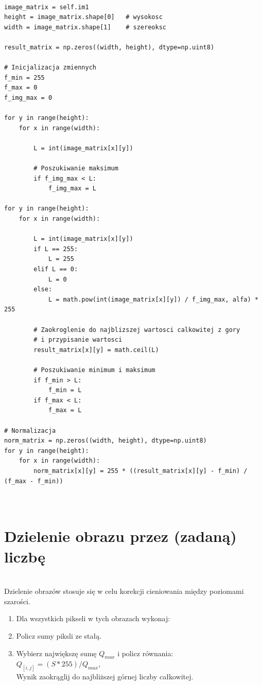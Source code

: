 \documentclass[final,a4paper,openany,12pt]{mwbk}
\begin{document}
\begin{lstlisting}[caption=Potęgowanie obrazu szarego (z zadaną potęgą)]

image_matrix = self.im1
height = image_matrix.shape[0]   # wysokosc
width = image_matrix.shape[1]    # szereoksc

result_matrix = np.zeros((width, height), dtype=np.uint8)

# Inicjalizacja zmiennych
f_min = 255
f_max = 0
f_img_max = 0

for y in range(height):
    for x in range(width):  
        
        L = int(image_matrix[x][y])

        # Poszukiwanie maksimum
        if f_img_max < L:
            f_img_max = L

for y in range(height):
    for x in range(width):  
        
        L = int(image_matrix[x][y])
        if L == 255:
            L = 255
        elif L == 0:
            L = 0
        else:
            L = math.pow(int(image_matrix[x][y]) / f_img_max, alfa) * 255

        # Zaokroglenie do najblizszej wartosci calkowitej z gory
        # i przypisanie wartosci
        result_matrix[x][y] = math.ceil(L)

        # Poszukiwanie minimum i maksimum
        if f_min > L:
            f_min = L
        if f_max < L:
            f_max = L

# Normalizacja
norm_matrix = np.zeros((width, height), dtype=np.uint8)
for y in range(height):
    for x in range(width):
        norm_matrix[x][y] = 255 * ((result_matrix[x][y] - f_min) / (f_max - f_min))



\end{lstlisting}
\newpage

\section {Dzielenie obrazu przez (zadaną) liczbę }
\hfill\\
\indent
Dzielenie obrazów stosuje się w celu korekcji cieniowania między poziomami szarości.

\begin{enumerate}	
		
		\item Dla wszystkich pikseli w tych obrazach wykonaj:
		\item Policz sumy piksli ze stałą.
		\item Wybierz największę sumę $Q_{max}$ i policz równania:\\
		$Q_[i,j] = ({S} * 255)/Q_{max}$,\\
		Wynik zaokrąglij do najbliższej górnej liczby całkowitej.
	\end{enumerate}
	
\end{document}

